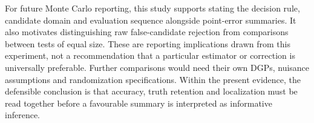 For future Monte Carlo reporting, this study supports stating the decision rule, candidate domain and evaluation sequence alongside point-error summaries. It also motivates distinguishing raw false-candidate rejection from comparisons between tests of equal size. These are reporting implications drawn from this experiment, not a recommendation that a particular estimator or correction is universally preferable. Further comparisons would need their own DGPs, nuisance assumptions and randomization specifications. Within the present evidence, the defensible conclusion is that accuracy, truth retention and localization must be read together before a favourable summary is interpreted as informative inference.
